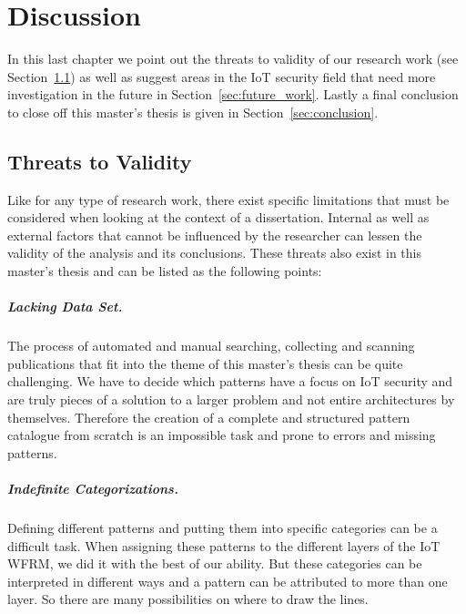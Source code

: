 
\chapter{Discussion}\label{ch:discussion}
In this last chapter we point out the threats to validity of our research work (see Section~\ref{sec:threats}) as well as suggest areas in the IoT security field that need more investigation in the future in Section~\ref{sec:future_work}. Lastly a final conclusion to close off this master's thesis is given in Section~\ref{sec:conclusion}.

\section{Threats to Validity}\label{sec:threats}
Like for any type of research work, there exist specific limitations that must be considered when looking at the context of a dissertation. Internal as well as external factors that cannot be influenced by the researcher can lessen the validity of the analysis and its conclusions. These threats also exist in this master's thesis and can be listed as the following points:

\paragraph{Lacking Data Set.} The process of automated and manual searching, collecting and scanning publications that fit into the theme of this master's thesis can be quite challenging. We have to decide which patterns have a focus on IoT security and are truly pieces of a solution to a larger problem and not entire architectures by themselves. Therefore the creation of a complete and structured pattern catalogue from scratch is an impossible task and prone to errors and missing patterns.

\paragraph{Indefinite Categorizations.} Defining different patterns and putting them into specific categories can be a difficult task. When assigning these patterns to the different layers of the IoT WFRM, we did it with the best of our ability. But these categories can be interpreted in different ways and a pattern can be attributed to more than one layer. So there are many possibilities on where to draw the lines. 

